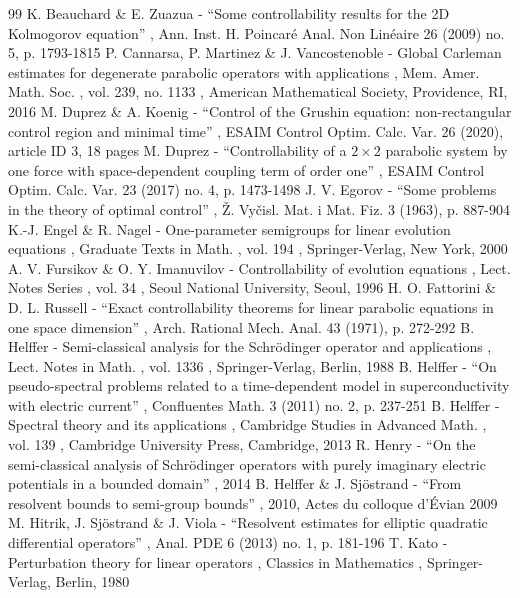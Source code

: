 \documentclass[11pt]{article}
\numberwithin{equation}{section}
\theoremstyle{plain}
\theoremstyle{definition}
\newcommand{\1}{\mathds 1}
\begin{document}
\begin{thebibliography}{99}
 K. Beauchard \& E. Zuazua - “Some controllability results for the 2D Kolmogorov equation” , Ann. Inst. H. Poincaré Anal. Non Linéaire 26 (2009) no. 5, p. 1793-1815
 P. Cannarsa, P. Martinez \& J. Vancostenoble - Global Carleman estimates for degenerate parabolic operators with applications , Mem. Amer. Math. Soc. , vol. 239, no. 1133 , American Mathematical Society, Providence, RI, 2016
 M. Duprez \& A. Koenig - “Control of the Grushin equation: non-rectangular control region and minimal time” , ESAIM Control Optim. Calc. Var. 26 (2020), article ID 3, 18 pages
 M. Duprez - “Controllability of a $2\times 2$ parabolic system by one force with space-dependent coupling term of order one” , ESAIM Control Optim. Calc. Var. 23 (2017) no. 4, p. 1473-1498
 J. V. Egorov - “Some problems in the theory of optimal control” , Ž. Vyčisl. Mat. i Mat. Fiz. 3 (1963), p. 887-904
 K.-J. Engel \& R. Nagel - One-parameter semigroups for linear evolution equations , Graduate Texts in Math. , vol. 194 , Springer-Verlag, New York, 2000
 A. V. Fursikov \& O. Y. Imanuvilov - Controllability of evolution equations , Lect. Notes Series , vol. 34 , Seoul National University, Seoul, 1996
 H. O. Fattorini \& D. L. Russell - “Exact controllability theorems for linear parabolic equations in one space dimension” , Arch. Rational Mech. Anal. 43 (1971), p. 272-292
 B. Helffer - Semi-classical analysis for the Schrödinger operator and applications , Lect. Notes in Math. , vol. 1336 , Springer-Verlag, Berlin, 1988
 B. Helffer - “On pseudo-spectral problems related to a time-dependent model in superconductivity with electric current” , Confluentes Math. 3 (2011) no. 2, p. 237-251
 B. Helffer - Spectral theory and its applications , Cambridge Studies in Advanced Math. , vol. 139 , Cambridge University Press, Cambridge, 2013
 R. Henry - “On the semi-classical analysis of Schrödinger operators with purely imaginary electric potentials in a bounded domain” , 2014
 B. Helffer \& J. Sjöstrand - “From resolvent bounds to semi-group bounds” , 2010, Actes du colloque d’Évian 2009
 M. Hitrik, J. Sjöstrand \& J. Viola - “Resolvent estimates for elliptic quadratic differential operators” , Anal. PDE 6 (2013) no. 1, p. 181-196
 T. Kato - Perturbation theory for linear operators , Classics in Mathematics , Springer-Verlag, Berlin, 1980

\end{thebibliography}
\end{document}
